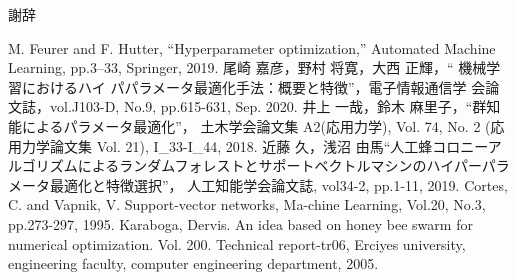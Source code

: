 \documentclass[12pt, dvipdfmx]{jarticle}
\numberwithin{equation}{section}
\begin{document}

\tableofcontents %
\clearpage %

\clearpage %
\clearpage
\clearpage
\clearpage
\clearpage

\clearpage
\clearpage

謝辞 %
\clearpage

\begin{thebibliography}{99} %
M. Feurer and F. Hutter, “Hyperparameter optimization,” Automated Machine Learning, pp.3–33, Springer, 2019.
尾崎 嘉彦，野村 将寛，大西 正輝，“ 機械学習におけるハイ
パパラメータ最適化手法：概要と特徴”，電子情報通信学
会論文誌，vol.J103-D, No.9, pp.615-631, Sep. 2020.
井上 一哉，鈴木 麻里子，“群知能によるパラメータ最適化”，
土木学会論文集 A2(応用力学), Vol. 74, No. 2 (応用力学論文集 Vol. 21), I\_33-I\_44, 2018.
近藤 久，浅沼 由馬“人工蜂コロニーアルゴリズムによるランダムフォレストとサポートベクトルマシンのハイパーパラメータ最適化と特徴選択”，
人工知能学会論文誌, vol34-2, pp.1-11, 2019.
Cortes, C. and Vapnik, V. Support-vector networks, Ma-chine Learning, Vol.20, No.3, pp.273-297, 1995.
Karaboga, Dervis. An idea based on honey bee swarm for numerical optimization. Vol. 200. 
Technical report-tr06, Erciyes university, engineering faculty, computer engineering department, 2005.
\end{thebibliography} %
\end{document}
